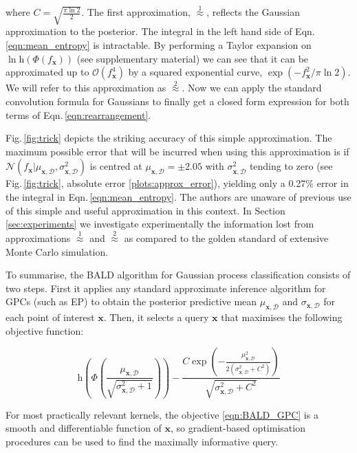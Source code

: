 \documentclass[twoside]{article}
\newcommand{\x}{\bm{x}}
\newcommand{\data}{\mathcal{D}}
\newcommand{\rmh}{\mathrm{h}}
\begin{document}
where $C=\sqrt{\frac{\pi\ln2}{2}}$. The first approximation, {\scriptsize $\stackrel{1}{\approx}$}, reflects the Gaussian approximation to the posterior. The integral in the left hand side of Eqn.\,\eqref{eqn:mean_entropy} is intractable. By performing a Taylor expansion on $\ln \rmh(\Phi(f_{\x}))$ (see supplementary material) we can see that it can be approximated up to $\mathcal{O}(f_{\x}^4)$ by a squared exponential curve, $\exp(-f_{\x}^2/\pi\ln2)$. We will refer to this approximation as {\scriptsize $\stackrel{2}{\approx}$}. Now we can apply the standard convolution formula for Gaussians to finally get a closed form expression for both terms of Eqn.\,\eqref{eqn:rearrangement}.

Fig.\,\ref{fig:trick} depicts the striking accuracy of this simple approximation. The maximum possible error that will be incurred when using this approximation is if $\mathcal{N}(f_{\x}\vert \mu_{\x,\data},\sigma_{\x,\data}^2)$ is centred at $\mu_{\x,\data}=\pm 2.05$  with $\sigma_{\x,\data}^2$ tending to zero (see Fig.\,\ref{fig:trick}, absolute error \ref{plots:approx_error}), yielding only a 0.27\% error in the integral in Eqn.\,\eqref{eqn:mean_entropy}. The authors are unaware of previous use of this simple and useful approximation in this context.  In Section \ref{sec:experiments} we investigate experimentally the information lost from approximations {\scriptsize $\stackrel{1}{\approx}$} and {\scriptsize $\stackrel{2}{\approx}$} as compared to the golden standard of extensive Monte Carlo simulation.

To summarise, the BALD algorithm for Gaussian process classification consists of two steps. First it applies any standard approximate inference algorithm for GPCs (such as EP) to obtain the posterior predictive mean $\mu_{\x,\data}$ and $\sigma_{\x,\data}$ for each point of interest $\x$. Then, it selects a query $\x$ that maximises the following objective function:

\begin{equation}
	\rmh \left( \Phi\left( \frac{\mu_{\x,\data}}{\sqrt{\sigma^2_{\x,\data} + 1}} \right)\right) - \frac{C \exp\left(-\frac{\mu_{\x,\data}^2}{2\left(\sigma_{\x,\data}^2 + C^2\right)}\right)}{\sqrt{\sigma_{\x,\data}^2 + C^2}} \label{eqn:BALD_GPC}
\end{equation}

For most practically relevant kernels, the objective \eqref{eqn:BALD_GPC} is a smooth and differentiable function of $\x$, so gradient-based optimisation procedures can be used to find the maximally informative query.
\end{document}
